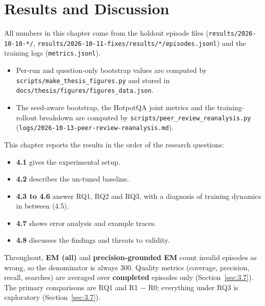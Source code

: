 \chapter{Results and Discussion}\label{sec:4}

All numbers in this chapter come from the holdout episode files
(\texttt{results/\allowbreak{}2026-\allowbreak{}10-\allowbreak{}10-\allowbreak{}*/\allowbreak{}},
\texttt{results/\allowbreak{}2026-\allowbreak{}10-\allowbreak{}11-\allowbreak{}fixes/\allowbreak{}results/\allowbreak{}*/\allowbreak{}episodes.\allowbreak{}jsonl})
and the training logs (\texttt{metrics.\allowbreak{}jsonl}).

\begin{itemize}
\tightlist
\item
  Per-run and question-only bootstrap values are computed by
  \texttt{scripts/\allowbreak{}make\_\allowbreak{}thesis\_\allowbreak{}figures.\allowbreak{}py}
  and stored in
  \texttt{docs/\allowbreak{}thesis/\allowbreak{}figures/\allowbreak{}figures\_\allowbreak{}data.\allowbreak{}json}.
\item
  The seed-aware bootstrap, the HotpotQA joint metrics and the
  training-rollout breakdown are computed by
  \texttt{scripts/\allowbreak{}peer\_\allowbreak{}review\_\allowbreak{}reanalysis.\allowbreak{}py}
  (\texttt{logs/\allowbreak{}2026-\allowbreak{}10-\allowbreak{}13-\allowbreak{}peer-\allowbreak{}review-\allowbreak{}reanalysis.\allowbreak{}md}).
\end{itemize}

This chapter reports the results in the order of the research questions:

\begin{itemize}
\tightlist
\item
  \textbf{4.1} gives the experimental setup.
\item
  \textbf{4.2} describes the un-tuned baseline.
\item
  \textbf{4.3 to 4.6} answer RQ1, RQ2 and RQ3, with a diagnosis of
  training dynamics in between (4.5).
\item
  \textbf{4.7} shows error analysis and example traces.
\item
  \textbf{4.8} discusses the findings and threats to validity.
\end{itemize}

Throughout, \textbf{EM (all)} and \textbf{precision-grounded EM} count
invalid episodes as wrong, so the denominator is always 300. Quality
metrics (coverage, precision, recall, searches) are averaged over
\textbf{completed} episodes only (Section~\ref{sec:3.7}). The primary
comparisons are RQ1 and R1 − R0; everything under RQ3 is exploratory
(Section~\ref{sec:3.7}).

